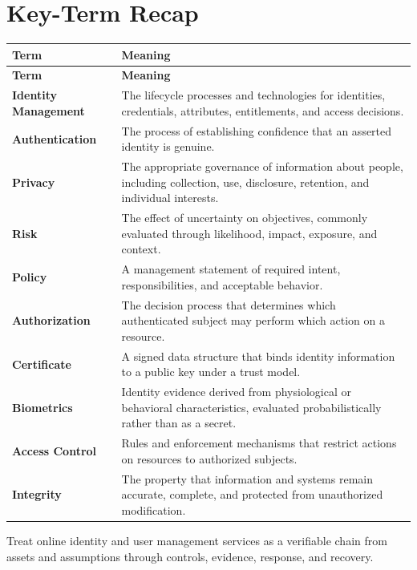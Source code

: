 \documentclass[11pt]{article}
\begin{document}
\section*{Key-Term Recap}
\begin{longtable}{>{\RaggedRight\arraybackslash}p{}>{\RaggedRight\arraybackslash}p{}}
\toprule\rowcolor{Navy}\color{white}\textbf{Term} & \color{white}\textbf{Meaning}\\\midrule
\endfirsthead
\toprule\rowcolor{Navy}\color{white}\textbf{Term} & \color{white}\textbf{Meaning}\\\midrule
\endhead
\textbf{Identity Management} & The lifecycle processes and technologies for identities, credentials, attributes, entitlements, and access decisions. \\\midrule
\textbf{Authentication} & The process of establishing confidence that an asserted identity is genuine. \\\midrule
\textbf{Privacy} & The appropriate governance of information about people, including collection, use, disclosure, retention, and individual interests. \\\midrule
\textbf{Risk} & The effect of uncertainty on objectives, commonly evaluated through likelihood, impact, exposure, and context. \\\midrule
\textbf{Policy} & A management statement of required intent, responsibilities, and acceptable behavior. \\\midrule
\textbf{Authorization} & The decision process that determines which authenticated subject may perform which action on a resource. \\\midrule
\textbf{Certificate} & A signed data structure that binds identity information to a public key under a trust model. \\\midrule
\textbf{Biometrics} & Identity evidence derived from physiological or behavioral characteristics, evaluated probabilistically rather than as a secret. \\\midrule
\textbf{Access Control} & Rules and enforcement mechanisms that restrict actions on resources to authorized subjects. \\\midrule
\textbf{Integrity} & The property that information and systems remain accurate, complete, and protected from unauthorized modification. \\\midrule
\bottomrule
\end{longtable}
\begin{takeawaybox}
Treat online identity and user management services as a verifiable chain from assets and assumptions through controls, evidence, response, and recovery.
\end{takeawaybox}
\end{document}
